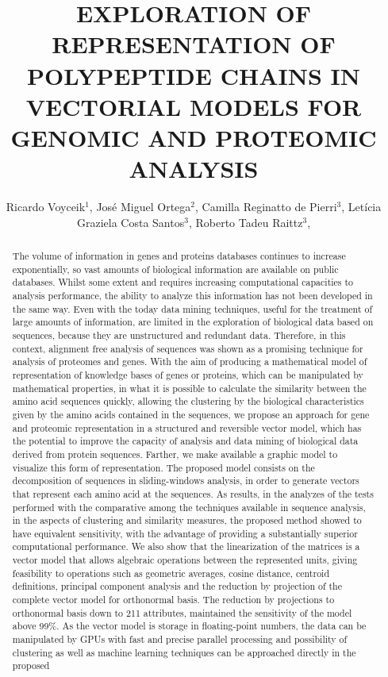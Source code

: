 \documentclass[twoside]{article}
\title{\vspace{-15mm}\fontsize{24pt}{10pt}\selectfont\textbf{ EXPLORATION OF REPRESENTATION OF POLYPEPTIDE CHAINS IN VECTORIAL MODELS FOR GENOMIC AND PROTEOMIC ANALYSIS }} %
\author{ Ricardo Voyceik$^{1}$, José Miguel Ortega$^{2}$, Camilla Reginatto de Pierri$^{3}$, Letícia Graziela Costa Santos$^{3}$, Roberto Tadeu Raittz$^{3}$, }
\affil{ 1 UFMG

2 Universidade Federal de Minas Gerais, Laboratório de Biodados

3 UFPR

 }
\date{}
\begin{document}
  
  
  \maketitle %
  
  
  \thispagestyle{fancy} %
  
  
  \begin{abstract}
  The volume of information in genes and proteins databases continues to increase exponentially, so vast amounts of biological information are available on public databases. Whilst some extent and requires increasing computational capacities to analysis performance, the ability to analyze this information has not been developed in the same way. Even with the today data mining techniques, useful for the treatment of large amounts of information, are limited in the exploration of biological data based on sequences, because they are unstructured and redundant data. Therefore, in this context, alignment free analysis of sequences was shown as a promising technique for analysis of proteomes and genes. With the aim of producing a mathematical model of representation of knowledge bases of genes or proteins, which can be manipulated by mathematical properties, in what it is possible to calculate the similarity between the amino acid sequences quickly, allowing the clustering by the biological characteristics given by the amino acids contained in the sequences, we propose an approach for gene and proteomic representation in a structured and reversible vector model, which has the potential to improve the capacity of analysis and data mining of biological data derived from protein sequences. Farther, we make available a graphic model to visualize this form of representation. The proposed model consists on the decomposition of sequences in sliding-windows analysis, in order to generate vectors that represent each amino acid at the sequences. As results, in the analyzes of the tests performed with the comparative among the techniques available in sequence analysis, in the aspects of clustering and similarity measures, the proposed method showed to have equivalent sensitivity, with the advantage of providing a substantially superior computational performance. We also show that the linearization of the matrices is a vector model that allows algebraic operations between the represented units, giving feasibility to operations such as geometric averages, cosine distance, centroid definitions, principal component analysis and the reduction by projection of the complete vector model for orthonormal basis. The reduction by projections to orthonormal basis down to 211 attributes, maintained the sensitivity of the model above 99\%. As the vector model is storage in floating-point numbers, the data can be manipulated by GPUs with fast and precise parallel processing and possibility of clustering as well as machine learning techniques can be approached directly in the proposed 
\end{abstract}
\end{document}
